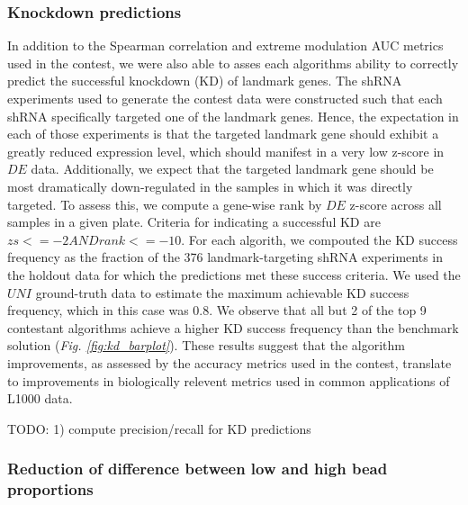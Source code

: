 \documentclass[]{article}
\begin{document}
\color{black}

\hypertarget{knockdown-predictions}{%
\subsubsection{Knockdown predictions}\label{knockdown-predictions}}

In addition to the Spearman correlation and extreme modulation AUC
metrics used in the contest, we were also able to asses each algorithms
ability to correctly predict the successful knockdown (KD) of landmark
genes. The shRNA experiments used to generate the contest data were
constructed such that each shRNA specifically targeted one of the
landmark genes. Hence, the expectation in each of those experiments is
that the targeted landmark gene should exhibit a greatly reduced
expression level, which should manifest in a very low z-score in \(DE\)
data. Additionally, we expect that the targeted landmark gene should be
most dramatically down-regulated in the samples in which it was directly
targeted. To assess this, we compute a gene-wise rank by \(DE\) z-score
across all samples in a given plate. Criteria for indicating a
successful KD are \(zs <= -2 AND rank <= -10\). For each algorith, we
compouted the KD success frequency as the fraction of the 376
landmark-targeting shRNA experiments in the holdout data for which the
predictions met these success criteria. We used the \(UNI\) ground-truth
data to estimate the maximum achievable KD success frequency, which in
this case was 0.8. We observe that all but 2 of the top 9 contestant
algorithms achieve a higher KD success frequency than the benchmark
solution ({\it Fig. \ref{fig:kd_barplot}}). These results suggest that
the algorithm improvements, as assessed by the accuracy metrics used in
the contest, translate to improvements in biologically relevent metrics
used in common applications of L1000 data.

\color{red}

TODO: 1) compute precision/recall for KD predictions

\color{black}

\hypertarget{reduction-of-difference-between-low-and-high-bead-proportions}{%
\subsubsection{Reduction of difference between low and high bead
proportions}\label{reduction-of-difference-between-low-and-high-bead-proportions}}
\end{document}
